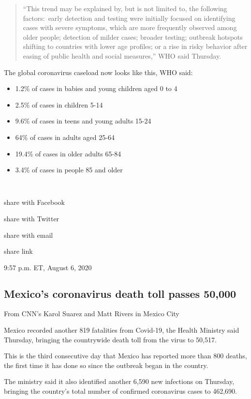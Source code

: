 \begin{quote}
``This trend may be explained by, but is not limited to, the following
factors:~early detection and testing were initially focused on
identifying cases with severe symptoms, which are more frequently
observed among older people; detection of milder cases; broader testing;
outbreak hotspots shifting to countries with lower age profiles; or a
rise in risky behavior after easing of public health and social
measures,'' WHO said Thursday.
\end{quote}

The global coronavirus caseload now looks like this, WHO said:

\begin{itemize}
\tightlist
\item
  1.2\% of cases in babies and young children aged 0 to 4
\item
  2.5\% of cases in children 5-14
\item
  9.6\% of cases in teens and young adults 15-24
\item
  64\% of cases in adults aged 25-64
\item
  19.4\% of cases in older adults 65-84
\item
  3.4\% of cases in people 85 and older
\end{itemize}

~

share with Facebook

share with Twitter

share with email

share link

9:57 p.m. ET, August 6, 2020

\hypertarget{mexicos-coronavirus-death-toll-passes-50000}{%
\subsection{Mexico's coronavirus death toll passes
50,000}\label{mexicos-coronavirus-death-toll-passes-50000}}

From CNN's Karol Suarez and Matt Rivers in Mexico City

Mexico recorded another 819 fatalities from Covid-19, the Health
Ministry said Thursday, bringing the countrywide death toll from the
virus to 50,517.

This is the third consecutive day that Mexico has reported more than 800
deaths, the first time it has done so since the outbreak began in the
country.

The ministry said it also identified another 6,590 new infections on
Thursday, bringing the country's total number of confirmed coronavirus
cases to 462,690.

